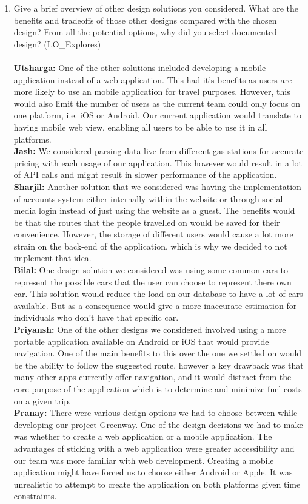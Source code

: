 \documentclass[12pt, titlepage]{article}
\begin{document}
\begin{enumerate}
  \item Give a brief overview of other design solutions you considered.  What
  are the benefits and tradeoffs of those other designs compared with the chosen
  design?  From all the potential options, why did you select documented design? (LO\_Explores)\\ \\
  \textbf{Utsharga:} One of the other solutions included developing a mobile application instead of a web application. This had it's benefits as users are more likely to use an mobile application for travel purposes. However, this would also limit the number of users as the current team could only focus on one platform, i.e. iOS or Android. Our current application would translate to having mobile web view, enabling all users to be able to use it in all platforms.\\
  \textbf{Jash:} We considered parsing data live from different gas stations for accurate pricing with each usage of our application. This however would result in a lot of API calls and might result in slower performance of the application.\\
  \textbf{Sharjil:} Another solution that we considered was having the implementation of accounts system either internally within the website or through social media login instead of just using the website as a guest. The benefits would be that the routes that the people travelled on would be saved for their convenience. However, the storage of different users would cause a lot more strain on the back-end of the application, which is why we decided to not implement that idea. \\
  \textbf{Bilal:} One design solution we considered was using some common cars to represent the possible cars that the user can choose to represent there own car. This solution would reduce the load on our database to have a lot of cars available. But as a consequence would give a more inaccurate estimation for individuals who don't have that specific car.\\
  \textbf{Priyansh:} One of the other designs we considered involved using a more portable application available on Android or iOS that would provide navigation. One of the main benefits to this over the one we settled on would be the ability to follow the suggested route, however a key drawback was that many other apps currently offer navigation, and it would distract from the core purpose of the application which is to determine and minimize fuel costs on a given trip.\\
  \textbf{Pranay:} There were various design options we had to choose between while developing our project Greenway. One of the design decisions we had to make was whether to create a web application or a mobile application. The advantages of sticking with a web application were greater accessibility and our team was more familiar with web development. Creating a mobile application might have forced us to choose either Android or Apple. It was unrealistic to attempt to create the application on both platforms given time constraints.\\
\end{enumerate}
\end{document}
